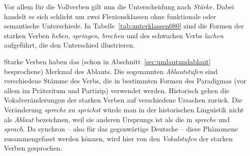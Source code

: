 Vor allem für die Vollverben gilt nun die Unterscheidung nach \textit{Stärke}.
Dabei handelt es sich schlicht um zwei Flexionsklassen ohne funktionale oder semantische Unterschiede.
In Tabelle~\ref{tab:unterklassen080} sind die Formen der starken Verben \textit{heben}, \textit{springen}, \textit{brechen} und des schwachen Verbs \textit{lachen} aufgeführt, die den Unterschied illustrieren.

\begin{table}[!htbp]
  \caption{Beispielformen starker und schwacher Verben}
  \label{tab:unterklassen080}
\end{table}

Starke Verben haben das (schon in Abschnitt~\ref{sec:umlautundablaut} besprochene) Merkmal des Ablauts.
Die sogenannten \textit{Ablautstufen} sind verschiedene Stämme des Verbs, die in bestimmten Formen des Paradigmas (vor allem im Präteritum und Partizip) verwendet werden.
Historisch gehen die Vokalveränderungen der starken Verben auf verschiedene Ursachen zurück.
Die Veränderung \textit{spreche} zu \textit{sprichst} würde man \zB in der historischen Linguistik nicht als \textit{Ablaut} bezeichnen, weil sie anderen Ursprungs ist als die in \textit{spreche} und \textit{sprach}.
Da synchron -- also für das gegenwärtige Deutsche -- diese Phänomene zusammengefasst werden können, wird hier von den \textit{Vokalstufen} der starken Verben gesprochen.


